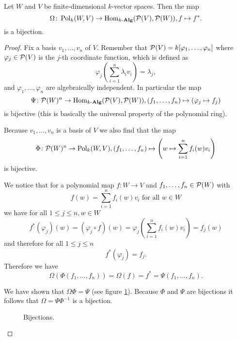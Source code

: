 \begin{prop}
 Let $W$ and $V$ be finite-dimensional $k$-vector spaces. Then the map
 \[
  \Omega \colon \operatorname{Pol}_k(W,V) \to \operatorname{Hom}_{k\text{-}\mathbf{Alg}}(\mathcal{P}(V), \mathcal{P}(W)), f \mapsto f^*.
 \]
 is a bijection.
\end{prop}
\begin{proof}
 Fix a basis $v_1, \dotsc, v_n$ of $V$. Remember that $\mathcal{P}(V) = k[\varphi_1, \dotsc, \varphi_n]$ where $\varphi_j \in \mathcal{P}(V)$ is the $j$-th coordinate function, which is defined as
 \[
  \varphi_j\left(\sum_{i=1}^n \lambda_i v_i\right) = \lambda_j,
\]
 and $\varphi_1, \dotsc, \varphi_n$ are algebraically independent. In particular the map
 \[
  \Psi \colon \mathcal{P}(W)^n \to \operatorname{Hom}_{k\text{-}\mathbf{Alg}}(\mathcal{P}(V),\mathcal{P}(W)), (f_1, \dotsc, f_n) \mapsto (\varphi_j \mapsto f_j)
 \]
 is bijective (this is basically the universal property of the polynomial ring).
 
 Because $v_1, \dotsc, v_n$ is a basis of $V$ we also find that the map
 \[
  \Phi \colon \mathcal{P}(W)^n \to \operatorname{Pol}_k(W,V), (f_1, \dotsc, f_n) \mapsto \left(w \mapsto \sum_{i=1}^n f_i(w)v_i\right)
 \]
 is bijective.
 
 We notice that for a polynomial map $f \colon W \to V$ and $f_1, \dotsc, f_n \in \mathcal{P}(W)$ with
 \[
  f(w) = \sum_{i=1}^n f_i(w) v_i \text{ for all } w \in W
 \]
 we have for all $1 \leq j \leq n, w \in W$
 \[
  f^*(\varphi_j)(w)
  = (\varphi_j \circ f)(w)
  = \varphi_j\left(\sum_{i=1}^n f_i(w) v_i\right)
  = f_j(w)
 \]
 and therefore for all $1 \leq j \leq n$
 \[
  f^*(\varphi_j) = f_j.
 \]
 Therefore we have
 \[
  \Omega(\Phi(f_1, \dotsc, f_n)) = \Omega(f) = f^* = \Psi(f_1, \dotsc, f_n).
 \]
 
 We have shown that $\Omega \Phi = \Psi$ (see figure \ref{fig: bijections}). Because $\Phi$ and $\Psi$ are bijections it follows that $\Omega = \Psi \Phi^{-1}$ is a bijection.
 
 \begin{figure}\centering
  \caption{Bijections.}
  \label{fig: bijections}
 \end{figure}
\end{proof}





